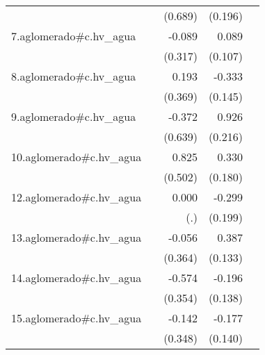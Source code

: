{\begin{longtable}{l*{4}{D{.}{.}{-1}}}
            &                     &     (0.689)         &     (0.196)         &                     \\
\addlinespace
7.aglomerado#c.hv\_agua&                     &      -0.089         &       0.089         &                     \\
            &                     &     (0.317)         &     (0.107)         &                     \\
\addlinespace
8.aglomerado#c.hv\_agua&                     &       0.193         &      -0.333\sym{*}  &                     \\
            &                     &     (0.369)         &     (0.145)         &                     \\
\addlinespace
9.aglomerado#c.hv\_agua&                     &      -0.372         &       0.926\sym{***}&                     \\
            &                     &     (0.639)         &     (0.216)         &                     \\
\addlinespace
10.aglomerado#c.hv\_agua&                     &       0.825         &       0.330         &                     \\
            &                     &     (0.502)         &     (0.180)         &                     \\
\addlinespace
12.aglomerado#c.hv\_agua&                     &       0.000         &      -0.299         &                     \\
            &                     &         (.)         &     (0.199)         &                     \\
\addlinespace
13.aglomerado#c.hv\_agua&                     &      -0.056         &       0.387\sym{**} &                     \\
            &                     &     (0.364)         &     (0.133)         &                     \\
\addlinespace
14.aglomerado#c.hv\_agua&                     &      -0.574         &      -0.196         &                     \\
            &                     &     (0.354)         &     (0.138)         &                     \\
\addlinespace
15.aglomerado#c.hv\_agua&                     &      -0.142         &      -0.177         &                     \\
            &                     &     (0.348)         &     (0.140)         &                     \\

\end{longtable}}
